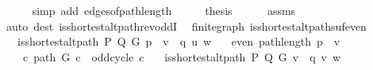 \begin{isabellebody}
\ \ \ \ \isamarkupfalse%
\ {\isacharparenleft}{\kern0pt}simp\ add{\isacharcolon}{\kern0pt}\ edges{\isacharunderscore}{\kern0pt}of{\isacharunderscore}{\kern0pt}path{\isacharunderscore}{\kern0pt}length{\isacharparenright}{\kern0pt}\isanewline
\ \ \isamarkupfalse%
\ \isamarkupfalse%
\ {\isacharquery}{\kern0pt}thesis\isanewline
\ \ \ \ \isamarkupfalse%
\ assms{\isacharparenleft}{\kern0pt}{}{\isacharparenright}{\kern0pt}\isanewline
\ \ \ \ \isamarkupfalse%
\ {\isacharparenleft}{\kern0pt}auto\ dest{\isacharcolon}{\kern0pt}\ is{\isacharunderscore}{\kern0pt}shortest{\isacharunderscore}{\kern0pt}alt{\isacharunderscore}{\kern0pt}path{\isacharunderscore}{\kern0pt}rev{\isacharunderscore}{\kern0pt}oddI{\isacharparenright}{\kern0pt}\isanewline
{}\isamarkupfalse%
%
\endisatagproof
{\isafoldproof}%
%
\isadelimproof
\isanewline
%
\endisadelimproof
%
\isadeliminvisible
\isanewline
%
\endisadeliminvisible
%
\isataginvisible
{}\isamarkupfalse%
\ {\isacharparenleft}{\kern0pt}\ finite{\isacharunderscore}{\kern0pt}graph{\isacharparenright}{\kern0pt}\ is{\isacharunderscore}{\kern0pt}shortest{\isacharunderscore}{\kern0pt}alt{\isacharunderscore}{\kern0pt}path{\isacharunderscore}{\kern0pt}suf{\isacharunderscore}{\kern0pt}even{\isacharcolon}{\kern0pt}\isanewline
\ \ \ {\isachardoublequoteopen}is{\isacharunderscore}{\kern0pt}shortest{\isacharunderscore}{\kern0pt}alt{\isacharunderscore}{\kern0pt}path\ P\ Q\ G\ {\isacharparenleft}{\kern0pt}p\ {\isacharat}{\kern0pt}\ v\ {\isacharhash}{\kern0pt}\ q{\isacharparenright}{\kern0pt}\ u\ w{\isachardoublequoteclose}\isanewline
\ \ \ {\isachardoublequoteopen}even\ {\isacharparenleft}{\kern0pt}path{\isacharunderscore}{\kern0pt}length\ {\isacharparenleft}{\kern0pt}p\ {\isacharat}{\kern0pt}\ {\isacharbrackleft}{\kern0pt}v{\isacharbrackright}{\kern0pt}{\isacharparenright}{\kern0pt}{\isacharparenright}{\kern0pt}{\isachardoublequoteclose}\isanewline
\ \ \ {\isachardoublequoteopen}{\isasymnot}\ {\isacharparenleft}{\kern0pt}{\isasymexists}c{\isachardot}{\kern0pt}\ path\ G\ c\ {\isasymand}\ odd{\isacharunderscore}{\kern0pt}cycle\ c{\isacharparenright}{\kern0pt}{\isachardoublequoteclose}\isanewline
\ \ \ {\isachardoublequoteopen}is{\isacharunderscore}{\kern0pt}shortest{\isacharunderscore}{\kern0pt}alt{\isacharunderscore}{\kern0pt}path\ P\ Q\ G\ {\isacharparenleft}{\kern0pt}v\ {\isacharhash}{\kern0pt}\ q{\isacharparenright}{\kern0pt}\ v\ w{\isachardoublequoteclose}%

\end{isabellebody}
